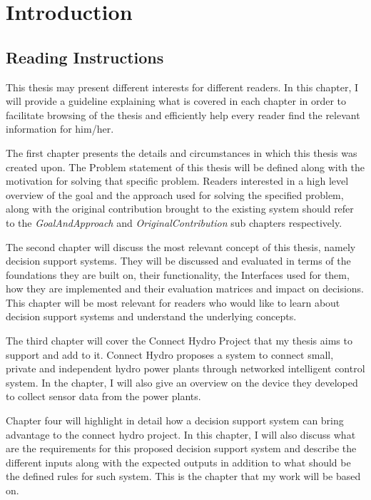 \chapter{Introduction}
\label{ChapterOne}
\section{Reading Instructions}
\label{sec:Reading Instructions}
\indent This thesis may present different interests for different readers. In this chapter, I will provide a guideline explaining what is covered in each chapter in order to facilitate browsing of the thesis and efficiently help every reader find the relevant information for him/her. 

\indent The first chapter presents the details and circumstances in which this thesis was created upon. The Problem statement of this thesis will be defined along with the motivation for solving that specific problem. Readers interested in a high level overview of the goal and the approach used for solving the specified problem, along with the original contribution brought to the existing system should refer to the \textit{GoalAndApproach} and \textit{OriginalContribution} sub chapters respectively.

\indent The second chapter will discuss the most relevant concept of this thesis, namely decision support systems. They will be discussed and evaluated in terms of the foundations they are built on, their functionality, the Interfaces used for them, how they are implemented and their evaluation matrices and impact on decisions. This chapter will be most relevant for readers who would like to learn about decision support systems and understand the underlying concepts.

\indent The third chapter will cover the Connect Hydro Project that my thesis aims to support and add to it. Connect Hydro proposes a system to connect small, private and independent hydro power plants through networked intelligent control system. In the chapter, I will also give an overview on the device they developed to collect sensor data from the power plants.

\indent Chapter four will highlight in detail how a decision support system can bring advantage to the connect hydro project. In this chapter, I will also discuss what are the requirements for this proposed decision support system and describe the different inputs along with the expected outputs in addition to what should be the defined rules for such system. This is the chapter that my work will be based on.

